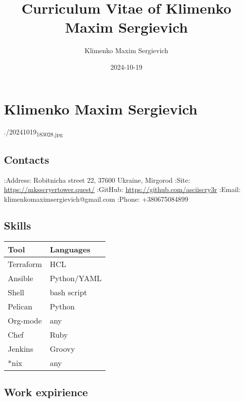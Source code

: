 \documentclass[11pt]{article}
\author{Klimenko Maxim Sergievich}
\date{2024-10-19}
\title{Curriculum Vitae of Klimenko Maxim Sergievich}
\begin{document}
\maketitle
\tableofcontents


\section{Klimenko Maxim Sergievich}
\label{sec:orgb6fde2e}

./20241019\textsubscript{183028.jpg}

\subsection{Contacts}
\label{sec:org2c0bdde}

:Address: Robitnicha street 22, 37600 Ukraine, Mirgorod
:Site: \url{https://mksscryertower.quest/}
:GitHub: \url{https://github.com/asciiscry3r}
:Email: klimenkomaximsergievich@gmail.com
:Phone: +380675084899

\subsection{Skills}
\label{sec:org54f2e19}

\begin{center}
\begin{tabular}{ll}
Tool & Languages\\[0pt]
\hline
Terraform & HCL\\[0pt]
Ansible & Python/YAML\\[0pt]
Shell & bash script\\[0pt]
Pelican & Python\\[0pt]
Org-mode & any\\[0pt]
Chef & Ruby\\[0pt]
Jenkins & Groovy\\[0pt]
*nix & any\\[0pt]
\end{tabular}
\end{center}

\subsection{Work expirience}
\label{sec:org3add80c}
\end{document}
